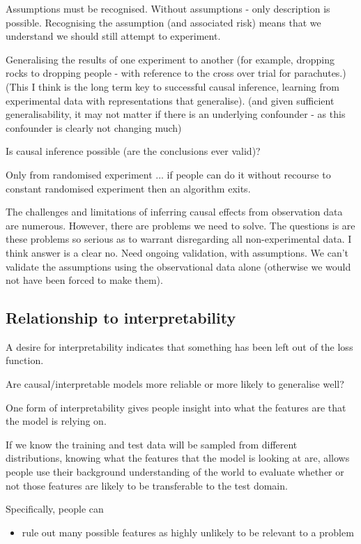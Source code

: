\documentclass[11pt,a4paper,oneside]{book}
\theoremstyle{plain}
\theoremstyle{definition}
\begin{document}
Assumptions must be recognised. Without assumptions - only description is possible. Recognising the assumption (and associated risk) means that we understand we should still attempt to experiment.

Generalising the results of one experiment to another (for example, dropping rocks to dropping people - with reference to the cross over trial for parachutes.) (This I think is the long term key to successful causal inference, learning from experimental data with representations that generalise). (and given sufficient generalisability, it may not matter if there is an underlying confounder - as this confounder is clearly not changing much)

Is causal inference possible (are the conclusions ever valid)?

Only from randomised experiment ... if people can do it without recourse to constant randomised experiment then an algorithm exits.

The challenges and limitations of inferring causal effects from observation data are numerous. However, there are problems we need to solve. The questions is are these problems so serious as to warrant disregarding all non-experimental data. I think answer is a clear no. Need ongoing validation, with assumptions. We can't validate the assumptions using the observational data alone (otherwise we would not have been forced to make them).


\subsection*{Relationship to interpretability}

A desire for interpretability indicates that something has been left out of the loss function. 

Are causal/interpretable models more reliable or more likely to generalise well? 

One form of interpretability gives people insight into what the features are that the model is relying on. 

If we know the training and test data will be sampled from different distributions, knowing what the features that the model is looking at are, allows people use their background understanding of the world to evaluate whether or not those features are likely to be transferable to the test domain. 

Specifically, people can
\begin{itemize}
\item rule out many possible features as highly unlikely to be relevant to a problem
\end{itemize}
\end{document}

